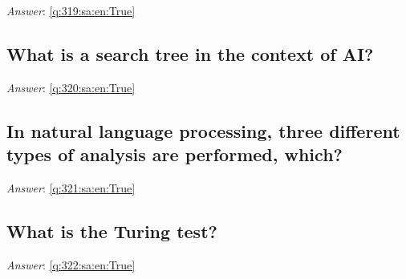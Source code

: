 \documentclass[a4paper,11pt,oneside]{article}
\begin{document}
\begin{sloppypar}
\label{q:319:sa:en:False}

\vspace{2cm}

\noindent\makebox[\textwidth]{\hrulefill}

\vspace{1cm}

\textit{Answer}: \autoref{q:319:sa:en:True}



\subsection{What is a search tree in the context of AI?}

\label{q:320:sa:en:False}

\vspace{2cm}

\noindent\makebox[\textwidth]{\hrulefill}

\vspace{1cm}

\textit{Answer}: \autoref{q:320:sa:en:True}



\subsection{In natural language processing, three different types of analysis are performed, which?}

\label{q:321:sa:en:False}

\vspace{2cm}

\noindent\makebox[\textwidth]{\hrulefill}

\vspace{1cm}

\textit{Answer}: \autoref{q:321:sa:en:True}



\subsection{What is the Turing test?}

\label{q:322:sa:en:False}

\vspace{2cm}

\noindent\makebox[\textwidth]{\hrulefill}

\vspace{1cm}

\textit{Answer}: \autoref{q:322:sa:en:True}




\end{sloppypar}
\end{document}

